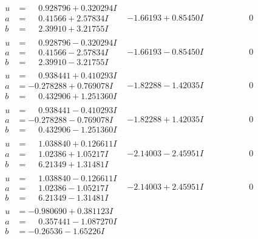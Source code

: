 \documentclass[1p]{elsarticle_modified}
\theoremstyle{definition}
\begin{document}
$$\begin{array}{c|c|c}
\begin{aligned}
u &= \phantom{-}0.928796 + 0.320294 I \\
a &= \phantom{-}0.41566 + 2.57834 I \\
b &= \phantom{-}2.39910 + 3.21755 I\end{aligned}
 & -1.66193 + 0.85450 I & \phantom{-0.000000 } 0 \\ \hline\begin{aligned}
u &= \phantom{-}0.928796 - 0.320294 I \\
a &= \phantom{-}0.41566 - 2.57834 I \\
b &= \phantom{-}2.39910 - 3.21755 I\end{aligned}
 & -1.66193 - 0.85450 I & \phantom{-0.000000 } 0 \\ \hline\begin{aligned}
u &= \phantom{-}0.938441 + 0.410293 I \\
a &= -0.278288 + 0.769078 I \\
b &= \phantom{-}0.432906 + 1.251360 I\end{aligned}
 & -1.82288 - 1.42035 I & \phantom{-0.000000 } 0 \\ \hline\begin{aligned}
u &= \phantom{-}0.938441 - 0.410293 I \\
a &= -0.278288 - 0.769078 I \\
b &= \phantom{-}0.432906 - 1.251360 I\end{aligned}
 & -1.82288 + 1.42035 I & \phantom{-0.000000 } 0 \\ \hline\begin{aligned}
u &= \phantom{-}1.038840 + 0.126611 I \\
a &= \phantom{-}1.02386 + 1.05217 I \\
b &= \phantom{-}6.21349 + 1.31481 I\end{aligned}
 & -2.14003 - 2.45951 I & \phantom{-0.000000 } 0 \\ \hline\begin{aligned}
u &= \phantom{-}1.038840 - 0.126611 I \\
a &= \phantom{-}1.02386 - 1.05217 I \\
b &= \phantom{-}6.21349 - 1.31481 I\end{aligned}
 & -2.14003 + 2.45951 I & \phantom{-0.000000 } 0 \\ \hline\begin{aligned}
u &= -0.980690 + 0.381123 I \\
a &= \phantom{-}0.357441 - 1.087270 I \\
b &= -0.26536 - 1.65226 I\end{aligned}

\end{array}$$
\end{document}
